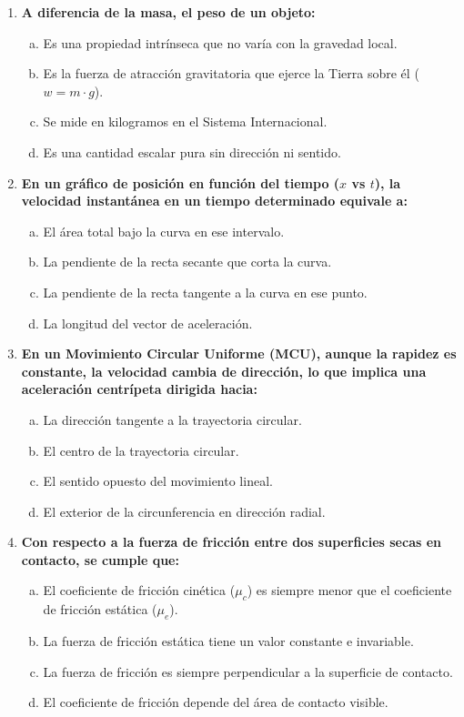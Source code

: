 \documentclass[11pt,a4paper]{article}
\begin{document}
\begin{enumerate}
    \item \textbf{A diferencia de la masa, el peso de un objeto:}
    \begin{enumerate}[a)]
        \item Es una propiedad intrínseca que no varía con la gravedad local.
        \item Es la fuerza de atracción gravitatoria que ejerce la Tierra sobre él ($w = m \cdot g$).
        \item Se mide en kilogramos en el Sistema Internacional.
        \item Es una cantidad escalar pura sin dirección ni sentido.
    \end{enumerate}

    \item \textbf{En un gráfico de posición en función del tiempo ($x$ vs $t$), la velocidad instantánea en un tiempo determinado equivale a:}
    \begin{enumerate}[a)]
        \item El área total bajo la curva en ese intervalo.
        \item La pendiente de la recta secante que corta la curva.
        \item La pendiente de la recta tangente a la curva en ese punto.
        \item La longitud del vector de aceleración.
    \end{enumerate}

    \item \textbf{En un Movimiento Circular Uniforme (MCU), aunque la rapidez es constante, la velocidad cambia de dirección, lo que implica una aceleración centrípeta dirigida hacia:}
    \begin{enumerate}[a)]
        \item La dirección tangente a la trayectoria circular.
        \item El centro de la trayectoria circular.
        \item El sentido opuesto del movimiento lineal.
        \item El exterior de la circunferencia en dirección radial.
    \end{enumerate}

    \item \textbf{Con respecto a la fuerza de fricción entre dos superficies secas en contacto, se cumple que:}
    \begin{enumerate}[a)]
        \item El coeficiente de fricción cinética ($\mu_c$) es siempre menor que el coeficiente de fricción estática ($\mu_e$).
        \item La fuerza de fricción estática tiene un valor constante e invariable.
        \item La fuerza de fricción es siempre perpendicular a la superficie de contacto.
        \item El coeficiente de fricción depende del área de contacto visible.
    \end{enumerate}


\end{enumerate}
\end{document}
